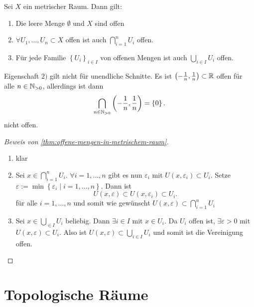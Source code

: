 \begin{theorem}\label{thm:offene-mengen-in-metrischem-raum}
    Sei $X$ ein metrischer Raum. Dann gilt:
    \begin{enumerate}[1)]
        \item Die leere Menge $\emptyset$ und $X$ sind offen
        \item  $\forall U_1,\ldots,U_n\subset X$ offen ist auch $\bigcap_{i=1}^n U_i$ offen.
        \item Für jede Familie $\left \{U_i\right\} _{i\in I}$ von offenen Mengen ist auch $\bigcup_{i\in I} U_i$ offen.
    \end{enumerate}
\end{theorem}
\begin{warning}
    Eigenschaft $2)$ gilt nicht für unendliche Schnitte. Es ist $\left( -\frac{1}{n},\frac{1}{n} \right) \subset \mathbb{R}$ offen für alle $n\in \mathbb{N}_{>0}$, allerdings ist dann
    \[
        \bigcap_{n\in \mathbb{N}_{>0}} \left( -\frac{1}{n},\frac{1}{n} \right)  = \left \{0\right\} 
    .\] 
    nicht offen.
\end{warning}

\begin{proof}[Beweis von \autoref{thm:offene-mengen-in-metrischem-raum}]
    \begin{enumerate}[1)]
        \item klar
        \item Sei $x\in \bigcap_{i=1}^n U_i$. $\forall i = 1,\ldots,n$ gibt es nun $ε_i$ mit  $U(x,ε_i)\subset U_i$. Setze $ε := \min \left \{ε_i \mid  i=1,\ldots,n\right\}$. Dann ist
            \[
                U(x,ε) \subset U(x,ε_i) \subset U_i
            .\] 
            für alle $i=1,\ldots,n$ und somit wie gewünscht $U(x,ε) \subset \bigcap_{i=1}^n U_i$
        \item Sei $x\in \bigcup_{\in I} U_i$ beliebig. Dann $\exists i\in I$ mit $x\in U_i$. Da $U_i$ offen ist,  $\exists ε>0$ mit $U(x,ε) \subset U_i$. Also ist $U(x,ε) \subset  \bigcup_{i\in I} U_i$ und somit ist die Vereinigung offen.
    \end{enumerate}
\end{proof}

\section{Topologische Räume} 
    

